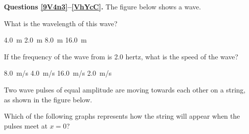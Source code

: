 \documentclass[answers]{exam}
\begin{document}
\noindent \textbf{Questions \ref{9V4n3}--\ref{VhYcC}.} The figure below shows a wave.

\begin{center}
\end{center}

\begin{questions}
\question \label{9V4n3}
What is the wavelength of this wave?

\begin{randomizechoices}
    \correctchoice \SI{4.0}{m}
    \choice \SI{2.0}{m}
    \choice \SI{8.0}{m}
    \choice \SI{16.0}{m}  
\end{randomizechoices}



\question \label{VhYcC}
If the frequency of the wave from is 2.0 hertz, what is the speed of the wave?

\begin{randomizechoices}
    \correctchoice \SI{8.0}{m/s}
    \choice \SI{4.0}{m/s}
    \choice \SI{16.0}{m/s}
    \choice \SI{2.0}{m/s}
\end{randomizechoices}

\question
Two wave pulses of equal amplitude are moving towards each other on a string, as shown in the figure below.


\begin{center}
\end{center}

Which of the following graphs represents how the string will appear when the pulses meet at $x=0$?



\end{questions}
\end{document}
